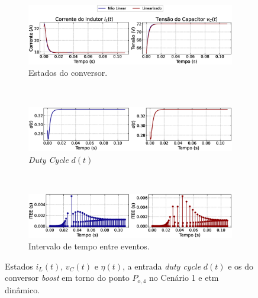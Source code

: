\begin{figure}[H]
  \centering
  \captionsetup{justification=centering}
  \begin{subfigure}{1.\textwidth}
    \centering
    \includegraphics[width=1.\textwidth]{figuras/dynamic-etm/boost/sim1/op2/result.eps}
    \caption{Estados do conversor.}
    \label{fig:boost_converter_constant_pcpl_dynamic_etm_op2_a}
  \end{subfigure}
  \\[6pt]
  \begin{subfigure}{1.\textwidth}
    \centering
    \includegraphics[width=1.\textwidth]{figuras/dynamic-etm/boost/sim1/op2/duty-cycle.eps}
    \caption{\textit{Duty Cycle} $d(t)$}
    \label{fig:boost_converter_constant_pcpl_dynamic_etm_op2_b}
  \end{subfigure}
  \\[6pt]
  \begin{subfigure}{1.\textwidth}
    \centering
    \includegraphics[width=1.\textwidth]{figuras/dynamic-etm/boost/sim1/op2/inter-event-times.eps}
    \caption{Intervalo de tempo entre eventos.}
    \label{fig:boost_converter_constant_pcpl_dynamic_etm_op2_c}
  \end{subfigure}
  \caption{Estados $i_L(t)$, $v_C(t)$ e $\eta(t)$, a entrada \textit{duty cycle} $d(t)$ e os  do conversor \textit{boost }em torno do ponto $P_{\mathrm{o}, 4}$ no Cenário 1 e \acrshort{etm} dinâmico.}
  \label{fig:boost_converter_constant_pcpl_dynamic_etm_op2}
\end{figure}


